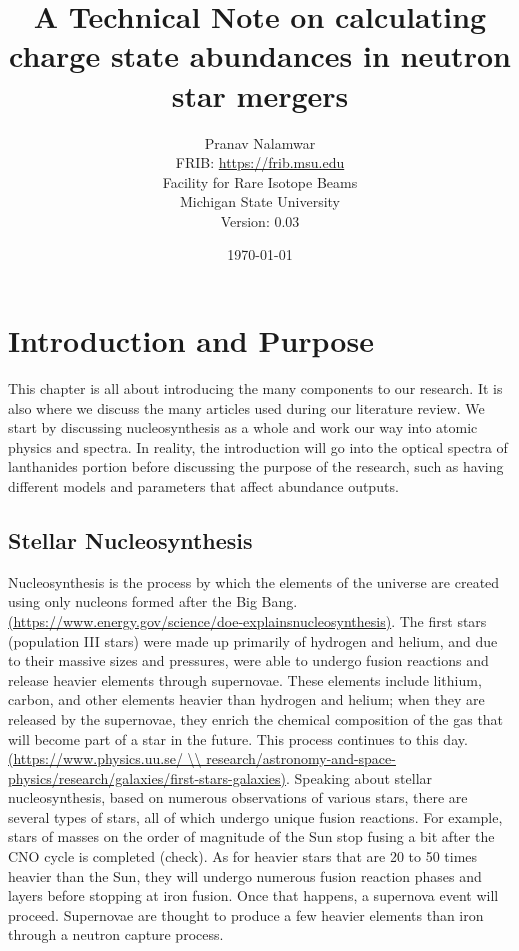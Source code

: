 \documentclass[11pt,a4paper]{article}
\begin{document}
\title{A Technical Note on calculating charge state abundances in neutron star mergers}

\author{Pranav Nalamwar\\FRIB: \url{https://frib.msu.edu}\\Facility for Rare Isotope Beams\\Michigan State University\\Version: 0.03} 
\date{\today}
\maketitle

\tableofcontents
\newpage

\section{Introduction and Purpose}

This chapter is all about introducing the many components to our research. It is also where we discuss the many articles used during our literature review. We start by discussing nucleosynthesis as a whole and work our way into atomic physics and spectra.
In reality, the introduction will go into the optical spectra of lanthanides portion before discussing the purpose of the research, such as having different models and parameters that affect abundance outputs.

\subsection{Stellar Nucleosynthesis}

Nucleosynthesis is the process by which the elements of the universe are created using only nucleons formed after the Big Bang. \url{(https://www.energy.gov/science/doe-explainsnucleosynthesis)}.  
The first stars (population III stars) were made up primarily of hydrogen and helium, and due to their massive sizes and pressures, were able to undergo fusion reactions and release heavier elements through supernovae. These elements include lithium, carbon, and other elements heavier than hydrogen and helium; when they are released by the supernovae, they enrich the chemical composition of the gas that will become part of a star in the future. This process continues to this day. \url{(https://www.physics.uu.se/ \\ research/astronomy-and-space-physics/research/galaxies/first-stars-galaxies)}. 
Speaking about stellar nucleosynthesis, based on numerous observations of various stars, there are several types of stars, all of which undergo unique fusion reactions. For example, stars of masses on the order of magnitude of the Sun stop fusing a bit after the CNO cycle is completed (check). As for heavier stars that are 20 to 50 times heavier than the Sun, they will undergo numerous fusion reaction phases and layers before stopping at iron fusion. Once that happens, a supernova event will proceed. Supernovae are thought to produce a few heavier elements than iron through a neutron capture process. 
\end{document}
